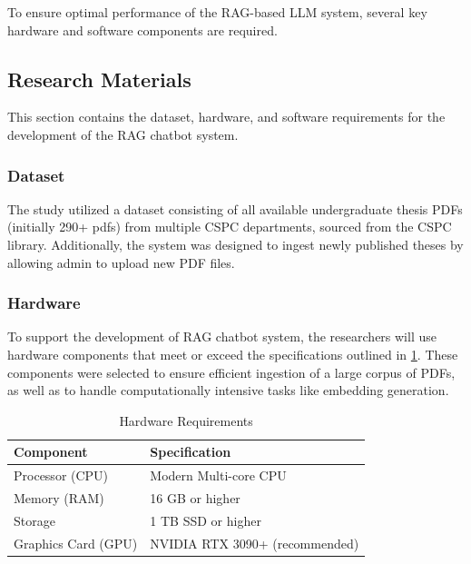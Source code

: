 \begin{refsection}
To ensure optimal performance of the RAG-based LLM system, several key hardware and software components are required.

\subsection{Research Materials}

This section contains the dataset, hardware, and software requirements for the development of the RAG chatbot system.

\subsubsection{Dataset}

The study utilized a dataset consisting of all available undergraduate thesis PDFs (initially 290+ pdfs) from multiple CSPC departments, sourced from the CSPC library. Additionally, the system was designed to ingest newly published theses by allowing admin to upload new PDF files.

\subsubsection{Hardware}

To support the development of RAG chatbot system, the researchers will use hardware components that meet or exceed the specifications outlined in \ref{tab:hardware_requirements}. These components were selected to ensure efficient ingestion of a large corpus of PDFs, as well as to handle computationally intensive tasks like embedding generation.

\begin{table}[H]
    \centering
    \caption{Hardware Requirements}
    \label{tab:hardware_requirements}
    \begin{tabular}{ll}
        \hline
        \textbf{Component}       & \textbf{Specification}                     \\ \hline
        Processor (CPU)          & Modern Multi-core CPU                      \\
        Memory (RAM)             & 16 GB or higher                            \\
        Storage                  & 1 TB SSD or higher                         \\
        Graphics Card (GPU)      & NVIDIA RTX 3090+ (recommended)             \\
        \hline
    \end{tabular}
\end{table}


\end{refsection}
